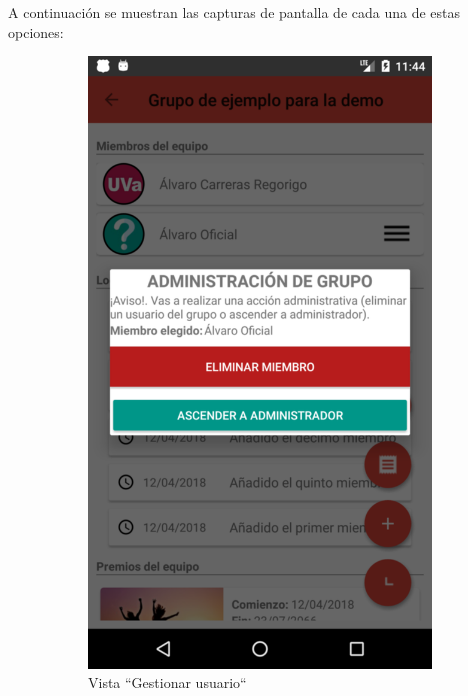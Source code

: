 \documentclass[twoside]{report}
\begin{document}
A continuación se muestran las capturas de pantalla de cada una de estas opciones:
\begin{figure}[H]
\begin{center}
	\begin{subfigure}[t]{.3\linewidth}
		\includegraphics[scale=0.25]{images/userguide/15a.png}
		\caption{Vista “Gestionar usuario“}
	\end{subfigure}\hspace{2mm}%
	\begin{subfigure}[t]{.3\linewidth}

\end{subfigure}
\end{center}
\end{figure}
\end{document}
